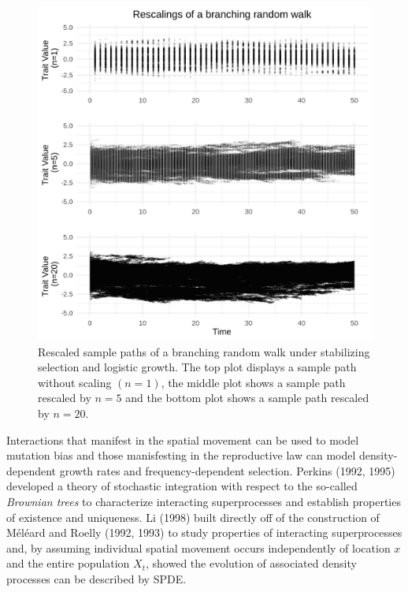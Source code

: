 \documentclass[]{article}
\begin{document}
\begin{figure}

{\centering \includegraphics{rescaled_plots} 

}

\caption{\label{rescaled}Rescaled sample paths of a branching random walk under stabilizing selection and logistic growth. The top plot displays a sample path without scaling $(n=1)$, the middle plot shows a sample path rescaled by $n=5$ and the bottom plot shows a sample path rescaled by $n=20$.}\label{fig:unnamed-chunk-4}
\end{figure}

Interactions that manifest in the spatial movement can be used to model
mutation bias and those manisfesting in the reproductive law can model
density-dependent growth rates and frequency-dependent selection.
Perkins (1992, 1995) developed a theory of stochastic integration with
respect to the so-called \emph{Brownian trees} to characterize
interacting superprocesses and establish properties of existence and
uniqueness. Li (1998) built directly off of the construction of Méléard
and Roelly (1992, 1993) to study properties of interacting
superprocesses and, by assuming individual spatial movement occurs
independently of location \(x\) and the entire population \(X_t\),
showed the evolution of associated density processes can be described by
SPDE.
\end{document}
